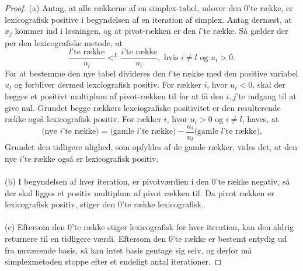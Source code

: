 \begin{proof}
(a)
Antag, at alle rækkerne af en simplex-tabel, udover den $0$'te række, er lexicografisk positive i begyndelsen af en iteration af simplex. 
Antag dernæst, at $x_j$ kommer ind i løsningen, og at pivot-rækken er den $l$'te række. Så gælder der per den lexicografiske metode, at
$$\dfrac{l\text{'te række}}{u_l}<^L \dfrac{i\text{'te række}}{u_i}, \text{  hvis } i\neq l \text{ og }u_i>0.$$
For at bestemme den nye tabel divideres den $l$'te række med den positive variabel $u_l$ og forbliver dermed lexciografisk positiv.
For rækker $i$, hvor $u_i<0$, skal der lægges et positivt multiplum af pivot-rækken til for at få den $i,j$'te indgang til at give nul. 
Grundet begge rækkers lexciografiske positivitet er den resulterende række også lexicografisk positiv. 
For rækker $i$, hvor $u_i>0$ og $i\neq l$, haves, at
$$\text{(nye }i\text{'te række)}=\text{(gamle }i\text{'te række)}-\dfrac{u_i}{u_l}\text{(gamle }l\text{'te række)}.$$
Grundet den tidligere ulighed, som opfyldes af de gamle rækker, vides det, at den nye $i$'te række også er lexicografisk positiv.\\\\
(b)
%
I begyndelsen af hver iteration, er pivotværdien i den $0$'te række negativ, så der skal ligges et positiv multiplum af pivot rækken til. 
Da pivot rækken er lexicografisk positiv, stiger den $0$'te række lexicografisk.\\\\
%
(c)
Eftersom den $0$'te række stiger lexicografisk for hver iteration, kan den aldrig returnere til en tidligere værdi.
Eftersom den $0$'te række er bestemt entydig ud fra nuværende basis, så kan intet basis gentage sig selv, og derfor må simplexmetoden stoppe efter et endeligt antal iterationer.
\end{proof}
%
%
%
%